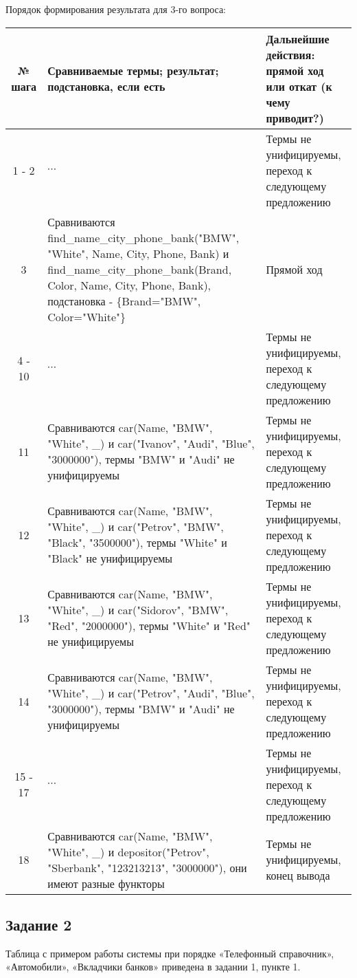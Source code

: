 \documentclass[a4paper,12pt]{article}
\begin{document}
Порядок формирования результата для 3-го вопроса:
\begin{table}[ht!] 
	\begin{tabularx}{\linewidth}{|c|>{\centering}X|>{\centering}X|}
		\hline
		№ шага & Сравниваемые термы; результат; подстановка, если есть & Дальнейшие действия: прямой ход или откат (к чему приводит?)\tabularnewline
		\hline
		1 - 2 & $\cdots$ & Термы не унифицируемы, переход к следующему предложению \tabularnewline
		\hline
		3 & Сравниваются find\_name\_city\_phone\_bank("BMW"{}, "White"{}, Name, City, Phone, Bank) и find\_name\_city\_phone\_bank(Brand, Color, Name, City, Phone, Bank), подстановка - \{Brand="BMW"{}, Color="White"\} & Прямой ход \tabularnewline
		\hline
		4 - 10 & $\cdots$ & Термы не унифицируемы, переход к следующему предложению \tabularnewline
		\hline
		11 & Сравниваются car(Name, "BMW"{}, "White"{}, \_) и car("Ivanov"{}, "Audi"{}, "Blue"{}, "3000000"), термы "BMW"{} и "Audi"{} не унифицируемы & Термы не унифицируемы, переход к следующему предложению \tabularnewline
		\hline
		12 & Сравниваются car(Name, "BMW"{}, "White"{}, \_) и car("Petrov"{}, "BMW"{}, "Black"{}, "3500000"), термы "White"{} и "Black"{} не унифицируемы & Термы не унифицируемы, переход к следующему предложению \tabularnewline
		\hline
		13 & Сравниваются car(Name, "BMW"{}, "White"{}, \_) и car("Sidorov"{}, "BMW"{}, "Red"{}, "2000000"), термы "White"{} и "Red"{} не унифицируемы & Термы не унифицируемы, переход к следующему предложению \tabularnewline
		\hline
		14 & Сравниваются car(Name, "BMW"{}, "White"{}, \_) и car("Petrov"{}, "Audi"{}, "Blue"{}, "3000000"), термы "BMW"{} и "Audi"{} не унифицируемы & Термы не унифицируемы, переход к следующему предложению \tabularnewline
		\hline
		15 - 17 & $\cdots$ & Термы не унифицируемы, переход к следующему предложению \tabularnewline
		\hline
		18 & Сравниваются car(Name, "BMW"{}, "White"{}, \_) и depositor("Petrov"{}, "Sberbank"{}, "123213213"{}, "3000000"), они имеют разные функторы & Термы не унифицируемы, конец вывода \tabularnewline
		\hline
	\end{tabularx}
\end{table}

\newpage

\subsection*{Задание 2}

Таблица с примером работы системы при порядке «Телефонный справочник», «Автомобили», «Вкладчики банков» приведена в задании 1, пункте 1. 
\end{document}
